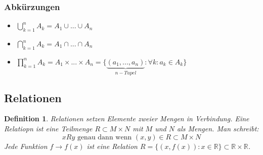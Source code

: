 \documentclass[12pt,a4paper]{report}%
\newtheorem{definition}[satz]{Definition}
\numberwithin{equation}{section}
\newcommand{\R}{\mathbb{R}} %
\numberwithin{equation}{subsection}
\begin{document}
	  \subsubsection{Abkürzungen}
	  \begin{itemize}
	    \item $\bigcup\limits_{k = 1}^n A_k = A_1 \cup ... \cup A_n$
	    \item $\bigcap\limits_{k=1}^n A_k = A_1 \cap ... \cap A_n$
	    \item $\prod\limits_{k=1}^n A_k = A_1 \times ... \times A_n = \lbrace \underbrace{(a_1, ..., a_n)}_{n-Tupel}:\forall k: a_k \in A_k \rbrace$
	  \end{itemize}
	\subsection{Relationen}
	\begin{definition}
	  Relationen setzen Elemente zweier Mengen in Verbindung. Eine Relatiopn ist eine Teilmenge $R\subset M \times N$ mit $M$ und $N$ als Mengen. Man schreibt:
	  \begin{equation*}
	    xRy \text{ genau dann wenn } (x,y) \in R\subset M\times N
	  \end{equation*}
	  Jede Funktion $f \rightarrow f(x)$ ist eine Relation $R=\lbrace (x, f(x)): x\in \R \rbrace \subset \R \times \R$.
	\end{definition}
\end{document}
